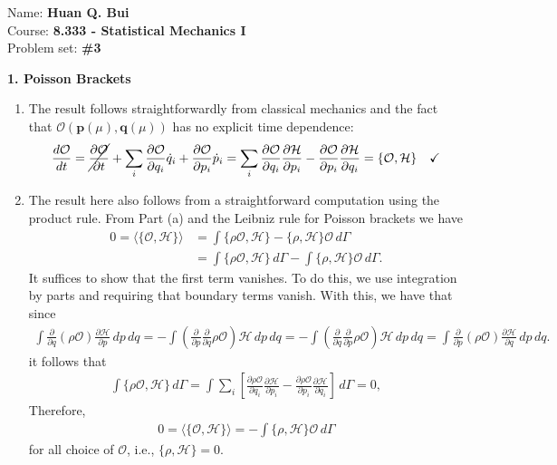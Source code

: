 \documentclass{article}
\theoremstyle{definition}
\newcommand{\p}{\partial}
\newcommand{\ham}{\mathcal{H}}
\newcommand{\f}[2]{\frac{#1}{#2}}
\newcommand{\lp}{\left(}
\newcommand{\rp}{\right)}
\newcommand{\lb}{\left[}
\newcommand{\rb}{\right]}
\begin{document}
		\begin{framed}
			\noindent Name: \textbf{Huan Q. Bui}\\
			Course: \textbf{8.333 - Statistical Mechanics I}\\
			Problem set: \textbf{\#3}
		\end{framed}
	



\noindent \textbf{1. Poisson Brackets}

\begin{enumerate}[label=(\alph*)]
	\item The result follows straightforwardly from classical mechanics and the fact that $\mathcal{O(\mathbf{p}(\mu), \mathbf{q}(\mu))}$ has no explicit time dependence:
	\begin{align*}
	\f{d\mathcal{O}}{d t} = \cancel{\f{\p \mathcal{O}}{\p t}} 
	+ \sum_i\f{\p \mathcal{O}}{\p q_i}\dot{q}_i + \f{\p \mathcal{O}}{\p p_i} \dot{p}_i 
	= \sum_i \f{\p \mathcal{O}}{\p q_i}\f{\p \ham }{\p p_i} - \f{\p \mathcal{O}}{\p p_i}\f{\p \ham}{\p q_i}
	 = \{ \mathcal{O},\ham \} \quad\checkmark
	\end{align*}
	
	\item The result here also follows from a straightforward computation using the product rule. From Part (a) and the Leibniz rule for Poisson brackets we have
	\begin{align*}
	0 =\langle \{ \mathcal{O}, \ham \}\rangle 
	&= \int \{ \rho \mathcal{O}, \ham \} - \{ \rho,\ham  \}\mathcal{O}  \,d\Gamma \\
	&= \int \{ \rho \mathcal{O}, \ham \}\,d\Gamma - \int \{ \rho,\ham  \}\mathcal{O}  \,d\Gamma. 
	\end{align*}
	It suffices to show that the first term vanishes. To do this, we use integration by parts and requiring that boundary terms vanish. With this, we have that since
	\begin{align*}
	\int \f{\p}{\p q} (\rho \mathcal{O}) \f{\p \ham }{\p p}  \,dp\,dq = -\int \lp \f{\p}{\p p} \f{\p}{\p q} \rho \mathcal{O}\rp \ham  \,dp\, dq = -\int \lp \f{\p}{\p q} \f{\p}{\p p} \rho \mathcal{O}\rp \ham  \,dp\, dq = \int \f{\p}{\p p}(\rho \mathcal{O}) \f{\p \ham}{\p q} \,dp\,dq.
	\end{align*}
	it follows that 
	\begin{align*}
	\int \{ \rho \mathcal{O}, \ham \}\,d\Gamma = \int \sum_i \lb \f{\p \rho \mathcal{O}}{\p q_i}\f{\p \ham}{\p p_i} - \f{\p \rho \mathcal{O}}{\p p_i}\f{\p \ham}{\p q_i} \rb \,d\Gamma = 0,
	\end{align*}
	Therefore, 
	\begin{align*}
	0 =\langle \{ \mathcal{O}, \ham \}\rangle = -\int \{ \rho,\ham  \}\mathcal{O}  \,d\Gamma
	\end{align*}
	for all choice of $\mathcal{O}$, i.e., $\{  \rho, \ham \} = 0$. 
	
\end{enumerate}
\end{document}
